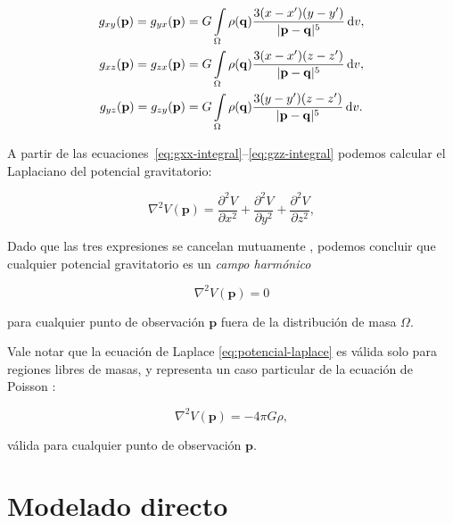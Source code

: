 \begin{align}
    g_{xy}(\mathbf{p}) =
    g_{yx}(\mathbf{p}) &=
        G \int\limits_\Omega \rho(\mathbf{q})
        \frac{3(x - x')(y - y')}{|\mathbf{p} - \mathbf{q}|^5}
        \mathop{}\!\textnormal{d} v,
    \label{eq:gxy-integral}
    \\
    g_{xz}(\mathbf{p}) =
    g_{zx}(\mathbf{p}) &=
        G \int\limits_\Omega \rho(\mathbf{q})
        \frac{3(x - x')(z - z')}{|\mathbf{p} - \mathbf{q}|^5}
        \mathop{}\!\textnormal{d} v,
    \label{eq:gxz-integral}
    \\
    g_{yz}(\mathbf{p}) =
    g_{zy}(\mathbf{p}) &=
        G \int\limits_\Omega \rho(\mathbf{q})
        \frac{3(y - y')(z - z')}{|\mathbf{p} - \mathbf{q}|^5}
        \mathop{}\!\textnormal{d} v.
    \label{eq:gyz-integral}
\end{align}

A partir de las ecuaciones~\ref{eq:gxx-integral}--\ref{eq:gzz-integral} podemos
calcular el Laplaciano del potencial gravitatorio:

\begin{equation}
    \nabla^2 V(\mathbf{p}) =
        \frac{\partial^2 V}{\partial x^2}
        + \frac{\partial^2 V}{\partial y^2}
        + \frac{\partial^2 V}{\partial z^2},
\end{equation}

\noindent Dado que las tres expresiones se cancelan mutuamente
\citep{blakely1995}, podemos concluir que cualquier potencial gravitatorio es
un \emph{campo harmónico}

\begin{equation}
    \nabla^2 V(\mathbf{p}) = 0
    \label{eq:potencial-laplace}
\end{equation}

\noindent para cualquier punto de observación $\mathbf{p}$ fuera de la
distribución de masa $\Omega$.

Vale notar que la ecuación de Laplace \ref{eq:potencial-laplace} es válida
solo para regiones libres de masas, y representa un caso particular de la
ecuación de Poisson \citep{blakely1995}:

\begin{equation}
    \nabla^2 V(\mathbf{p}) = -4\pi G \rho,
    \label{eq:potencial-poisson}
\end{equation}

\noindent válida para cualquier punto de observación $\mathbf{p}$.


\section{Modelado directo}

